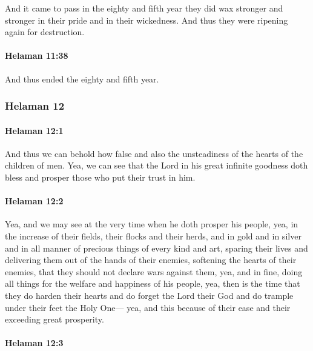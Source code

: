 			And it came to pass in the eighty and fifth year
			they did wax stronger and stronger in their pride and in their wickedness.
			And thus they were ripening again for destruction.

		\paragraph{Helaman 11:38} %
			\label{HELAMAN-11-38}

			And thus ended the eighty and fifth year.

	\subsubsection{Helaman 12} %
		\label{HELAMAN-12}
		
		\paragraph{Helaman 12:1} %
			\label{HELAMAN-12-1}

			And thus we can behold how false
			and also the unsteadiness of the hearts of the children of men.
			Yea, we can see that the Lord in his great infinite goodness
			doth bless and prosper those who put their trust in him.

		\paragraph{Helaman 12:2} %
			\label{HELAMAN-12-2}

			Yea, and we may see at the very time when he doth prosper his people,
			yea, in the increase of their fields, their flocks and their herds,
			and in gold and in silver
			and in all manner of precious things of every kind and art,
			sparing their lives and delivering them out of the hands of their enemies,
			softening the hearts of their enemies,
			that they should not declare wars against them,
			yea, and in fine, doing all things for the welfare and happiness of his people,
			yea, then is the time that they do harden their hearts
			and do forget the Lord their God
			and do trample under their feet the Holy One---
			yea, and this because of their ease and their exceeding great prosperity.

		\paragraph{Helaman 12:3} %
			\label{HELAMAN-12-3}

